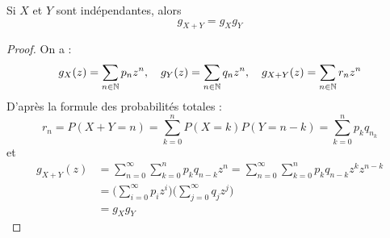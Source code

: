 \begin{theorem}
    Si $X$ et $Y$ sont indépendantes, alors 
        \[ g_{X + Y} = g_X g_Y \] 
\end{theorem}

\begin{proof}
    On a :
        \[ g_X(z) = \sum_{n\in \mathbb{N}} p_n z^n, \quad g_Y(z) = \sum_{n \in \mathbb{N}} q_n z^n, \quad g_{X+Y}(z) = \sum_{n \in \mathbb{N}} r_n z^n \] 
    D'après la formule des probabilités totales :
        \[ r_n = P(X + Y = n) = \sum_{k = 0}^{n} P(X = k) P(Y = n-k) = \sum_{k=0}^{n} p_k q_{n_k} \]
    et 
    \begin{align*}
        g_{X +Y}(z) &= \sum_{n = 0}^{\infty} \sum_{k = 0}^{n} p_k q_{n-k} z^n = \sum_{n = 0}^{\infty} \sum_{k = 0}^{n} p_k q_{n-k} z^k z^{n-k} \\
        &= \Biggl( \sum_{i = 0}^{\infty} p_i z^i \Biggr) \Biggl( \sum_{j = 0}^{\infty} q_j z^j \Biggr) \\
        &= g_X g_Y
    \end{align*}
   
\end{proof}

